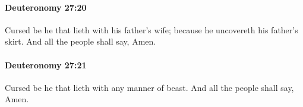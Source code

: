 		\paragraph{Deuteronomy 27:20} %
			\label{DEUTERONOMY-27-20}

			Cursed be he that lieth with his father's wife; because he uncovereth his father's skirt. And all the people shall say, Amen.


		\paragraph{Deuteronomy 27:21} %
			\label{DEUTERONOMY-27-21}

			Cursed be he that lieth with any manner of beast. And all the people shall say, Amen.



